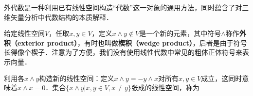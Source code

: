 

外代数是一种利用已有线性空间构造“代数”这一对象的通用方法，同时蕴含了对三维矢量分析中代数结构的本质解释．


给定线性空间$V$，任取$x, y\in V$，定义$x\wedge y\not\in V$是一个新的元素，其中符号$\wedge$称作\textbf{外积（exterior product）}，有时也叫做\textbf{楔积（wedge product）}，后者是由于符号长得像个楔子．注意为了方便，我们没有使用线性代数中常见的粗体正体符号来表示向量．

利用各$x\wedge y$构造新的线性空间：定义$x\wedge y=-y\wedge x$对所有$x, y\in V$成立，这同时意味着$x\wedge x=0$．集合$\{x\wedge y|x, y\in V, x\not=y\}$张成的线性空间，称为
